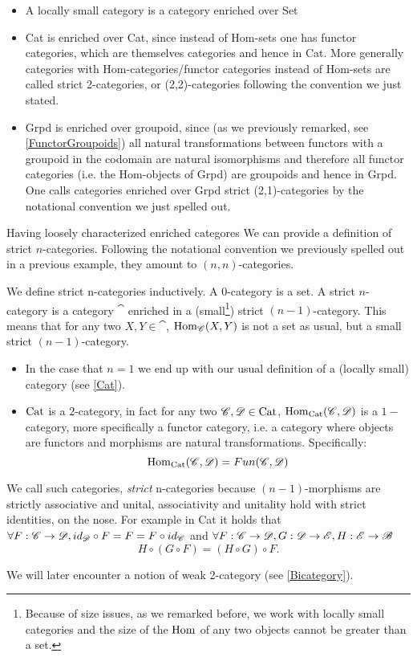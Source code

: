 \begin{ex}
    \hfill
    \begin{itemize}
        \item A locally small category is a category enriched over Set
        \item Cat is enriched over Cat, since instead of Hom-sets one has functor categories, which are themselves categories and hence in Cat. More generally categories with Hom-categories/functor categories instead of Hom-sets are called strict 2-categories, or (2,2)-categories following the convention we just stated.
        \item\label{2,1Grpd} Grpd is enriched over groupoid, since (as we previously remarked, see \ref{FunctorGroupoids}) all natural transformations between functors with a groupoid in the codomain are natural isomorphisms and therefore all functor categories (i.e. the Hom-objects of Grpd) are groupoids and hence in Grpd. One calls categories enriched over Grpd strict (2,1)-categories by the notational convention we just spelled out.
    \end{itemize}
\end{ex}
    
Having loosely characterized enriched categores We can provide a definition of strict $n$-categories. Following the notational convention we previously spelled out in a previous example, they amount to $(n,n)$-categories.
\begin{defn}\label{strict nCat}
    We define strict n-categories inductively. A 0-category is a set. A strict $n$-category is a category $\cat$ enriched in a (small\footnote{Because of size issues, as we remarked before, we work with locally small categories and the size of the $\operatorname{Hom}$ of any two objects cannot be greater than a set.}) strict $(n-1)$-category. This means that for any two $X,Y\in\cat$, $\operatorname{Hom}_{\mathscr{C}}(X,Y)$ is not a set as usual, but a small strict $(n-1)$-category.
\end{defn}
\begin{ex}
    \hfill
    \begin{itemize} 
        \item In the case that $n=1$ we end up with our usual definition of a (locally small) category (see \ref{Cat}).
        \item  $\operatorname{Cat}$ is a $2$-category, in fact for any two $\mathscr{C},\mathscr{D}\in \operatorname{Cat}$, $\operatorname{Hom}_{\operatorname{Cat}}(\mathscr{C},\mathscr{D})$ is a $1-$category, more specifically a functor category, i.e. a category where objects are functors and morphisms are natural transformations. Specifically:
        $$\operatorname{Hom}_{\operatorname{Cat}}(\mathscr{C},\mathscr{D})=Fun(\mathscr{C},\mathscr{D})$$
    \end{itemize}
\end{ex}

\begin{rem}\label{STRICT}
    We call such categories, \emph{strict} n-categories because $(n-1)$-morphisms are strictly associative and unital, associativity and unitality hold with strict identities, on the nose. For example in Cat it holds that $\forall F:\mathscr{C}\to\mathscr{D}, id_{\mathscr{D}}\circ F=F=F\circ id_{\mathscr{C}}$ and $\forall F:\mathscr{C}\to\mathscr{D}, G:\mathscr{D}\to\mathscr{E}, H:\mathscr{E}\to\mathscr{B}$
    $$H\circ(G\circ F)=(H\circ G)\circ F.$$
\end{rem}
\noindent We will later encounter a notion of weak 2-category (see \ref{Bicategory}).